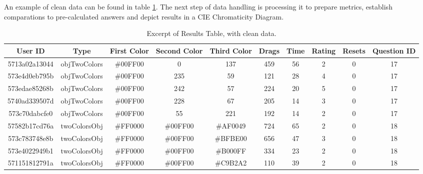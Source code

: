%
An example of clean data can be found in table \ref{table:csv_resultsclean}. The next step of data handling is processing it to prepare metrics, establish comparations
to pre-calculated answers and depict results in a CIE Chromaticity Diagram. \par
%
\begin{table}[htbp]
  \resizebox{\textwidth}{!} {
  \begin{tabular} {|c|c|c|c|c|c|c|c|c|c|}
    \hline
    User ID & Type & First Color & Second Color & Third Color & Drags & Time & Rating & Resets & Question ID \\ \hline \hline
    5713a02a13044 & objTwoColors & \#00FF00 & 0 & 137 & 459 & 56 & 2 & 0 & 17 \\ \hline
    573e4d0eb795b & objTwoColors & \#00FF00 & 235 & 59 & 121 & 28 & 4 & 0 & 17 \\ \hline
    573edae85268b & objTwoColors & \#00FF00 & 242 & 57 & 224 & 20 & 5 & 0 & 17 \\ \hline
    5740ad339507d & objTwoColors & \#00FF00 & 228 & 67 & 205 & 14 & 3 & 0 & 17 \\ \hline
    573c70dabcfe0 & objTwoColors & \#00FF00 & 55 & 221 & 192 & 14 & 2 & 0 & 17 \\ \hline
    57582b17cd76a & twoColorsObj & \#FF0000 & \#00FF00 & \#AF0049 & 724 & 65 & 2 & 0 & 18 \\ \hline
    573c783748e8b & twoColorsObj & \#FF0000 & \#00FF00 & \#BFBE00 & 656 & 47 & 3 & 0 & 18 \\ \hline
    573e4022949b1 & twoColorsObj & \#FF0000 & \#00FF00 & \#B000FF & 334 & 23 & 2 & 0 & 18 \\ \hline
    571151812791a & twoColorsObj & \#FF0000 & \#00FF00 & \#C9B2A2 & 110 & 39 & 2 & 0 & 18 \\
    \hline
  \end{tabular}}
  \caption[Excerpt of Clean "Results" Table]{Excerpt of Results Table, with clean data.}
  \label{table:csv_resultsclean}
\end{table}
